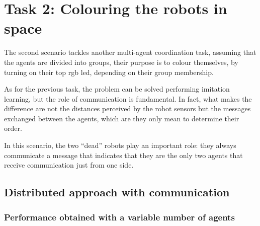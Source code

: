 \section{Task 2: Colouring the robots in space}
\label{sec:task2}

The second scenario tackles another multi-agent coordination task, assuming that 
the agents are divided into groups, their purpose is to colour themselves, by 
turning on their top \gls{rgb} \gls{led}, depending on their group membership. 

As for the previous task, the problem can be solved performing imitation 
learning, but the role of communication is fundamental. In fact, what makes the 
difference are not the distances perceived by the robot sensors but the messages 
exchanged between the agents, which are they only mean to determine their 
order. 

In this scenario, the two ``dead'' robots play an important role: they always 
communicate a message that indicates that they are the only two agents that 
receive communication just from one side.

\subsection{Distributed approach with communication}
\label{subsec:task2-exp-comm}


\subsubsection{Performance obtained with a variable number of agents}
\label{subsubsec:task2-exp-comm-1}

